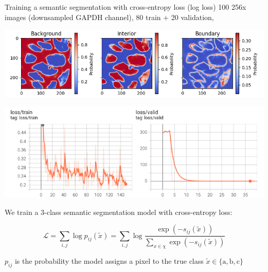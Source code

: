 \documentclass{beamer}					%
\begin{document}
\begin{frame}{Training a semantic segmentation with cross-entropy loss (log loss)}
\vspace{0.1in}
100 256\;x images (downsampled GAPDH channel), 80 train + 20 validation, 

\begin{center}
\includegraphics[width=1\textwidth]{Softmax.png}
\end{center}

\begin{center}
\includegraphics[width=1\textwidth]{Loss.png}
\end{center}

We train a 3-class semantic segmentation model with cross-entropy loss:

\begin{equation*}
\mathcal{L} = \sum_{i,j} \log p_{ij}(\tilde{x}) = \sum_{i,j} \log \frac{\exp(-s_{ij}(\tilde{x}))}{\sum_{x\in\chi} \exp(-s_{ij}(\tilde{x}))}
\end{equation*}

$p_{ij}$ is the probability the model assigns a pixel to the true class $\tilde{x} \in \{\textrm{a}, \textrm{b}, \textrm{c}\}$

\end{frame}
\end{document}

